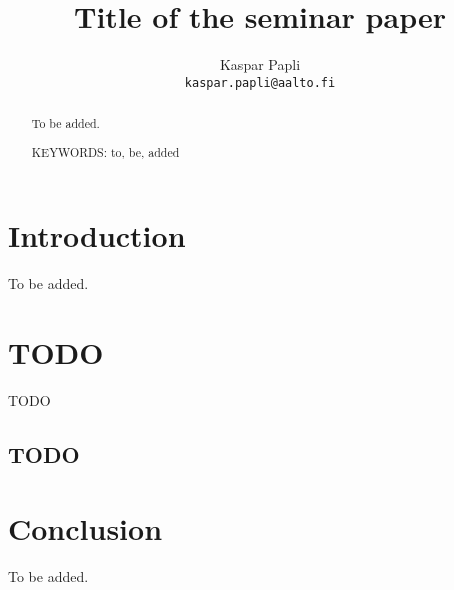 \documentclass[article]{aaltoseries}
\begin{document}
 

\title{Title of the seminar paper}

\author{Kaspar Papli
\\\textnormal{\texttt{kaspar.papli@aalto.fi}}}


\maketitle


\begin{abstract}
To be added.

\vspace{3mm}
\noindent KEYWORDS: to, be, added

\end{abstract}




\section{Introduction}

To be added.




\section{TODO}

TODO



\subsection{TODO}
\label{sec:TODO}




\section{Conclusion}

To be added.






\end{document}
